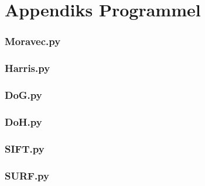 \chapter{Appendiks Programmel}
\label{sec:app} 
\subsection{Moravec.py}
\subsection{Harris.py}
\subsection{DoG.py}
\subsection{DoH.py}
\subsection{SIFT.py}
\subsection{SURF.py}